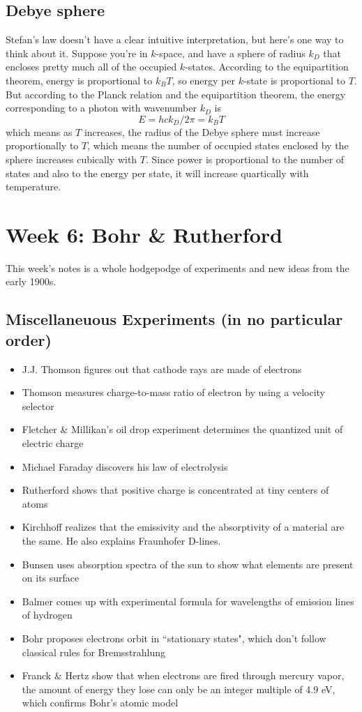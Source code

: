 \documentclass[12pt]{article}
\begin{document}
\subsection{Debye sphere}
Stefan's law doesn't have a clear intuitive interpretation, but here's one way to think about it. Suppose you're in $k$-space, and have a sphere of radius $k_D$ that encloses pretty much all of the occupied $k$-states. According to the equipartition theorem, energy is proportional to $k_B T$, so energy per $k$-state is proportional to $T$. But according to the Planck relation and the equipartition theorem, the energy corresponding to a photon with wavenumber $k_D$ is
\[ E = h c k_D / 2 \pi = k_B T \]
which means as $T$ increases, the radius of the Debye sphere must increase proportionally to $T$, which means the number of occupied states enclosed by the sphere increases cubically with $T$. Since power is proportional to the number of states and also to the energy per state, it will increase quartically with temperature.

\section{Week 6: Bohr \& Rutherford}

This week's notes is a whole hodgepodge of experiments and new ideas from the early 1900s.

\subsection{Miscellaneuous Experiments (in no particular order)}
\begin{itemize}
    \item J.J. Thomson figures out that cathode rays are made of electrons
    \item Thomson measures charge-to-mass ratio of electron by using a velocity selector
    \item Fletcher \& Millikan's oil drop experiment determines the quantized unit of electric charge
    \item Michael Faraday discovers his law of electrolysis
    \item Rutherford shows that positive charge is concentrated at tiny centers of atoms
    \item Kirchhoff realizes that the emissivity and the absorptivity of a material are the same. He also explains Fraunhofer D-lines.
    \item Bunsen uses absorption spectra of the sun to show what elements are present on its surface
    \item Balmer comes up with experimental formula for wavelengths of emission lines of hydrogen
    \item Bohr proposes electrons orbit in ``stationary states", which don't follow classical rules for Bremsstrahlung
    \item Franck \& Hertz show that when electrons are fired through mercury vapor, the amount of energy they lose can only be an integer multiple of 4.9 eV, which confirms Bohr's atomic model
\end{itemize}
\end{document}
